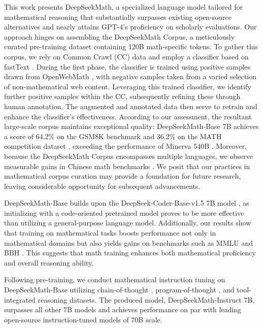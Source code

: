 This work presents DeepSeekMath, a specialized language model tailored for mathematical reasoning that substantially surpasses existing open-source alternatives and nearly attains GPT-4's proficiency on scholarly evaluations. Our approach hinges on assembling the DeepSeekMath Corpus, a meticulously curated pre-training dataset containing 120B math-specific tokens. To gather this corpus, we rely on Common Crawl (CC) data and employ a classifier based on fastText \citep{joulin2016fasttext}. During the first phase, the classifier is trained using positive samples drawn from OpenWebMath \citep{openwebmath}, with negative samples taken from a varied selection of non-mathematical web content. Leveraging this trained classifier, we identify further positive samples within the CC, subsequently refining these through human annotation. The augmented and annotated data then serve to retrain and enhance the classifier’s effectiveness. According to our assessment, the resultant large-scale corpus maintains exceptional quality: DeepSeekMath-Base 7B achieves a score of 64.2\% on the GSM8K benchmark \citep{gsm8k} and 36.2\% on the MATH competition dataset \citep{MATH}, exceeding the performance of Minerva 540B \citep{minerva}. Moreover, because the DeepSeekMath Corpus encompasses multiple languages, we observe measurable gains in Chinese math benchmarks \citep{wei2023cmath,agieval}. We posit that our practices in mathematical corpus curation may provide a foundation for future research, leaving considerable opportunity for subsequent advancements.

DeepSeekMath-Base builds upon the DeepSeek-Coder-Base-v1.5 7B model \citep{deepseek-coder}, as initializing with a code-oriented pretrained model proves to be more effective than utilizing a general-purpose language model. Additionally, our results show that training on mathematical tasks boosts performance not only in mathematical domains but also yields gains on benchmarks such as MMLU \citep{mmlu} and BBH \citep{bbh}. This suggests that math training enhances both mathematical proficiency and overall reasoning ability.

Following pre-training, we conduct mathematical instruction tuning on DeepSeekMath-Base utilizing chain-of-thought \citep{cot}, program-of-thought \citep{pot,pal}, and tool-integrated reasoning \citep{tora} datasets. The produced model, DeepSeekMath-Instruct 7B, surpasses all other 7B models and achieves performance on par with leading open-source instruction-tuned models of 70B scale.

